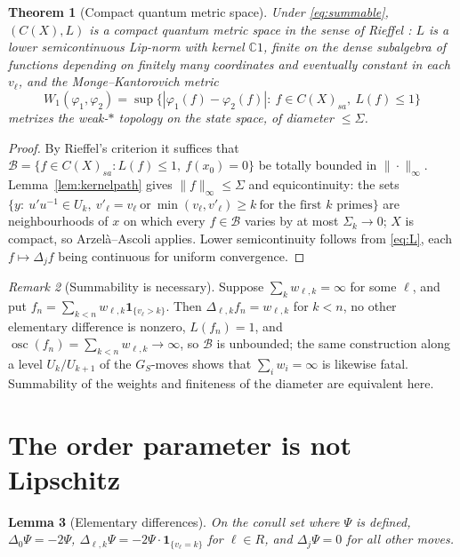 \documentclass[11pt]{amsart}
\numberwithin{equation}{section}
\newtheorem{theorem}{Theorem}[section]
\newtheorem{lemma}[theorem]{Lemma}
\theoremstyle{definition}
\theoremstyle{remark}
\newtheorem{remark}[theorem]{Remark}
\newcommand{\C}{\mathbb{C}}
\begin{document}
\begin{theorem}[Compact quantum metric space]\label{thm:cqms}
Under \eqref{eq:summable}, $(C(X),L)$ is a compact quantum metric space in the sense of
Rieffel \cite{Rieffel98,Rieffel99}: $L$ is a lower semicontinuous Lip-norm with kernel
$\C1$, finite on the dense subalgebra of functions depending on finitely many coordinates
and eventually constant in each $v_\ell$, and the Monge--Kantorovich metric
\[
W_1(\varphi_1,\varphi_2)=\sup\bigl\{|\varphi_1(f)-\varphi_2(f)|:\ f\in C(X)_{sa},\ L(f)\le1\bigr\}
\]
metrizes the weak-$*$ topology on the state space, of diameter $\le\Sigma$.
\end{theorem}

\begin{proof}
By Rieffel's criterion \cite[Thm.~1.8]{Rieffel98} it suffices that
$\mathcal B=\{f\in C(X)_{sa}:L(f)\le1,\ f(x_0)=0\}$ be totally bounded in $\|\cdot\|_\infty$.
Lemma~\ref{lem:kernelpath} gives $\|f\|_\infty\le\Sigma$ and equicontinuity: the sets
$\{y:\ u'u^{-1}\in U_k,\ v'_\ell=v_\ell\ \text{or}\ \min(v_\ell,v'_\ell)\ge k\ \text{for the first }k\text{ primes}\}$
are neighbourhoods of $x$ on which every $f\in\mathcal B$ varies by at most $\Sigma_k\to0$;
$X$ is compact, so Arzel\`a--Ascoli applies. Lower semicontinuity follows from \eqref{eq:L}, each
$f\mapsto\Delta_jf$ being continuous for uniform convergence.
\end{proof}

\begin{remark}[Summability is necessary]\label{rem:necessary}
Suppose $\sum_kw_{\ell,k}=\infty$ for some $\ell$, and put
$f_n=\sum_{k<n}w_{\ell,k}\mathbf 1_{\{v_\ell>k\}}$. Then $\Delta_{\ell,k}f_n=w_{\ell,k}$ for
$k<n$, no other elementary difference is nonzero, $L(f_n)=1$, and
$\operatorname{osc}(f_n)=\sum_{k<n}w_{\ell,k}\to\infty$, so $\mathcal B$ is unbounded; the
same construction along a level $U_k/U_{k+1}$ of the $G_S$-moves shows that
$\sum_iw_i=\infty$ is likewise fatal. Summability of the weights and finiteness of the
diameter are equivalent here.
\end{remark}

\section{The order parameter is not Lipschitz}

\begin{lemma}[Elementary differences]\label{lem:diffPsi}
On the conull set where $\Psi$ is defined,
$\Delta_0\Psi=-2\Psi$, $\Delta_{\ell,k}\Psi=-2\Psi\cdot\mathbf 1_{\{v_\ell=k\}}$ for
$\ell\in R$, and $\Delta_j\Psi=0$ for all other moves.
\end{lemma}
\end{document}
